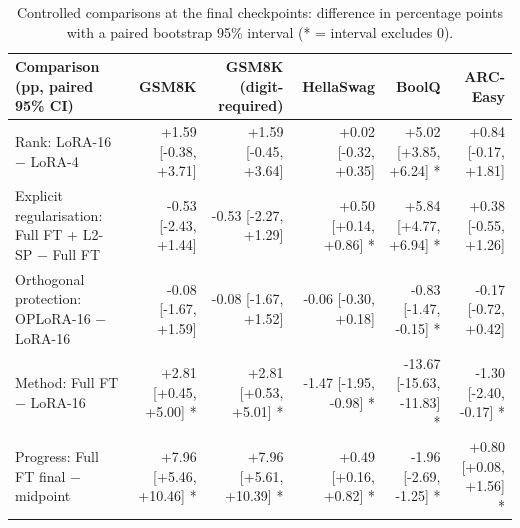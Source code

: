 \begin{table}[t]
\centering\small
\begin{tabular}{lrrrrr}
\toprule
Comparison (pp, paired 95\% CI) & GSM8K & GSM8K (digit-required) & HellaSwag & BoolQ & ARC-Easy \\
\midrule
Rank: LoRA-16 − LoRA-4 & +1.59 [-0.38, +3.71] & +1.59 [-0.45, +3.64] & +0.02 [-0.32, +0.35] & +5.02 [+3.85, +6.24] * & +0.84 [-0.17, +1.81] \\
Explicit regularisation: Full FT + L2-SP − Full FT & -0.53 [-2.43, +1.44] & -0.53 [-2.27, +1.29] & +0.50 [+0.14, +0.86] * & +5.84 [+4.77, +6.94] * & +0.38 [-0.55, +1.26] \\
Orthogonal protection: OPLoRA-16 − LoRA-16 & -0.08 [-1.67, +1.59] & -0.08 [-1.67, +1.52] & -0.06 [-0.30, +0.18] & -0.83 [-1.47, -0.15] * & -0.17 [-0.72, +0.42] \\
Method: Full FT − LoRA-16 & +2.81 [+0.45, +5.00] * & +2.81 [+0.53, +5.01] * & -1.47 [-1.95, -0.98] * & -13.67 [-15.63, -11.83] * & -1.30 [-2.40, -0.17] * \\
Progress: Full FT final − midpoint & +7.96 [+5.46, +10.46] * & +7.96 [+5.61, +10.39] * & +0.49 [+0.16, +0.82] * & -1.96 [-2.69, -1.25] * & +0.80 [+0.08, +1.56] * \\
\bottomrule
\end{tabular}
\caption{Controlled comparisons at the final checkpoints: difference in percentage points with a paired bootstrap 95\% interval (* = interval excludes 0).}
\label{tab:task1_comparisons}
\end{table}
